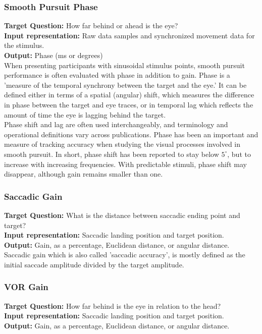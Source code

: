 \documentclass[12pt]{article}
\theoremstyle{definition}
\begin{document}
\subsubsection{Smooth Pursuit Phase}
\textbf{Target Question:} How far behind or ahead is the eye?\\
\textbf{Input representation:} Raw data samples and synchronized movement data for the stimulus.\\
\textbf{Output:} Phase (ms or degrees) \\

When presenting participants with sinusoidal stimulus points, smooth pursuit performance is often evaluated with phase in addition to gain. Phase is a 'measure of the temporal synchrony between the target and the eye.' It can be defined either in terms of a spatial (angular) shift, which measures the difference in phase between the target and eye traces, or in temporal lag which reflects the amount of time the eye is lagging behind the target.\\

Phase shift and lag are often used interchangeably, and terminology and operational definitions vary across publications. Phase has been an important and measure of tracking accuracy when studying the visual processes involved in smooth pursuit. In short, phase shift has been reported to stay below $5^\circ$, but to increase with increasing frequencies. With predictable stimuli, phase shift may disappear, although gain remains smaller than one.

\subsubsection{Saccadic Gain}
\textbf{Target Question:} What is the distance between saccadic ending point and target?\\
\textbf{Input representation:} Saccadic landing position and target position.\\
\textbf{Output:} Gain, as a percentage, Euclidean distance, or angular distance. \\

Saccadic gain which is also called 'saccadic accuracy', is mostly defined as the initial saccade amplitude divided by the target amplitude. 





\subsubsection{VOR Gain}
\textbf{Target Question:} How far behind is the eye in relation to the head?\\
\textbf{Input representation:} Saccadic landing position and target position.\\
\textbf{Output:} Gain, as a percentage, Euclidean distance, or angular distance. \\
\end{document}
